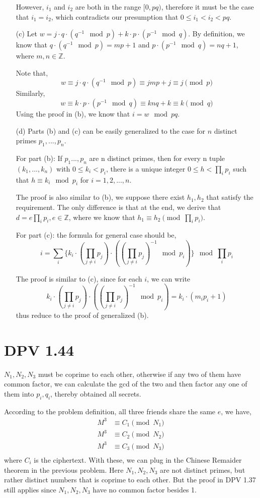 \documentclass[twoside]{homework}
\begin{document}
\begin{enumerate}
	However, $i_1$ and $i_2$ are both in the range $[0, pq)$, therefore it must be the case that $i_1 = i_2$, which contradicts our presumption that $0 \leq i_1 < i_2 < pq$.


	\item [(c)] Let $w = j \cdot q \cdot (q^{-1} \mod p) + k \cdot p \cdot (p^{-1} \mod q)$. By definition, we know that $q \cdot (q^{-1} \mod p) = mp + 1$ and $p \cdot (p^{-1} \mod q) = nq + 1$, where $m, n \in \mathbb{Z}$.

	Note that,
	\[w \equiv j \cdot q \cdot (q^{-1} \mod p) \equiv jmp + j \equiv j \pmod p\]
	Similarly,
	\[w \equiv k \cdot p \cdot (p^{-1} \mod q) \equiv knq + k \equiv k \pmod q\]
	Using the proof in (b), we know that $i = w \mod {pq}$.

	\item [(d)] Parts (b) and (c) can be easily generalized to the case for $n$ distinct primes $p_1, ..., p_n$.

	For part (b): If $p_1 ..., p_n$ are n distinct primes, then for every n tuple $(k_1, ..., k_n)$ with $0 \leq k_i < p_i$, there is a unique integer $0\leq h < \prod_i p_i$ such that $h \equiv k_i \mod p_i$ for $i = 1,2,...,n$.

	The proof is also similar to (b), we suppose there exist $h_1, h_2$ that satisfy the requirement. The only difference is that at the end, we derive that $d = e\prod_i p_i, e \in \mathbb{Z}$, where we know that $h_1 \equiv h_2 \pmod {\prod_i p_i}$.

	For part (c): the formula for general case should be,
	\[i = \sum_i \{k_i \cdot (\prod_{j\neq i}p_j) \cdot ((\prod_{j\neq i}p_j)^{-1} \mod p_i)\} \mod \prod_i p_i\]

	The proof is similar to (c), since for each $i$, we can write
	\[k_i \cdot (\prod_{j\neq i}p_j) \cdot ((\prod_{j\neq i}p_j)^{-1} \mod p_i) =k_i \cdot (m_ip_i+1)\]
	thus reduce to the proof of generalized (b).
\end{enumerate}

\section{DPV 1.44}
$N_1, N_2, N_3$ must be coprime to each other, otherwise if any two of them have common factor, we can calculate the gcd of the two and then factor any one of them into $p_i, q_i$, thereby obtained all secrets.

According to the problem definition, all three friends share the same $e$, we have,
\begin{align*}
	M^3 &\equiv C_1 \pmod {N_1} \\
	M^3 &\equiv C_2 \pmod {N_2} \\
	M^3 &\equiv C_3 \pmod {N_3} \\
\end{align*}
where $C_i$ is the ciphertext. With these, we can plug in the Chinese Remaider theorem in the previous problem. Here $N_1, N_2, N_3$ are not distinct primes, but rather distinct numbers that is coprime to each other. But the proof in DPV 1.37 still applies since $N_1, N_2, N_3$ have no common factor besides 1.
\end{document}
